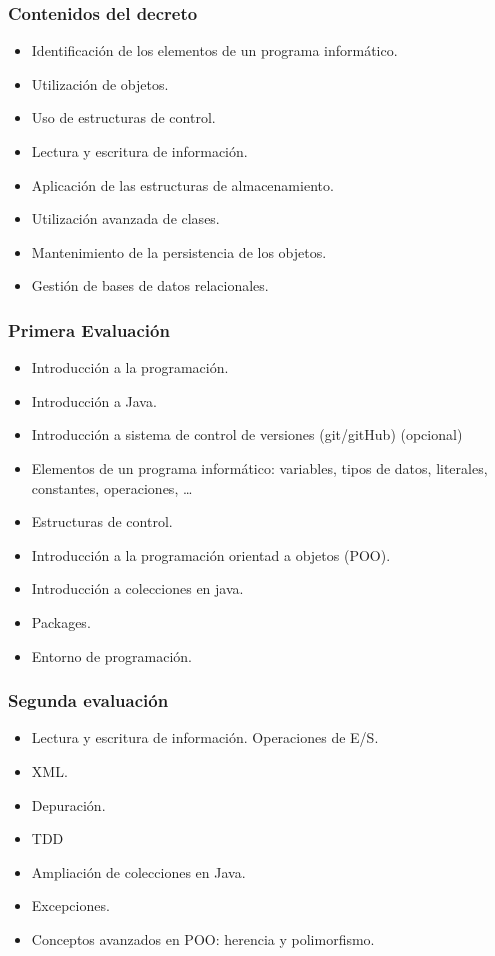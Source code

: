 \documentclass{beamer}
\begin{document}
\begin{frame}[fragile]
\frametitle{Contenidos del decreto}
\begin{itemize}[<+->]
\item Identificación de los elementos de un programa informático.
\item Utilización de objetos.
\item Uso de estructuras de control.
\item Lectura y escritura de información.
\item Aplicación de las estructuras de almacenamiento.
\item Utilización avanzada de clases.
\item Mantenimiento de la persistencia de los objetos.
\item Gestión de bases de datos relacionales.
\end{itemize}
\end{frame}

\begin{frame}
\frametitle{Primera Evaluación} 
\begin{itemize}[<+-| alert@+>]
\item Introducción a la programación.
\item Introducción a Java.
\item Introducción a sistema de control de versiones (git/gitHub) (opcional)
\item Elementos de un programa informático: variables, tipos de datos, literales, constantes, operaciones, \dots
\item Estructuras de control.
\item Introducción a la programación orientad a objetos (POO).
\item Introducción a colecciones en java.
\item Packages.
\item Entorno de programación.
\end{itemize}
\pause
\end{frame}

\begin{frame}[fragile]
\frametitle{Segunda evaluación}
\begin{itemize}[<+-| alert@+>]
\item Lectura y escritura de información. Operaciones de E/S.
\item XML.
\item Depuración.
\item TDD 
\item Ampliación de colecciones en Java.
\item Excepciones.
\item Conceptos avanzados en POO: herencia y polimorfismo.
\end{itemize}
\pause
\end{frame}
\end{document}

